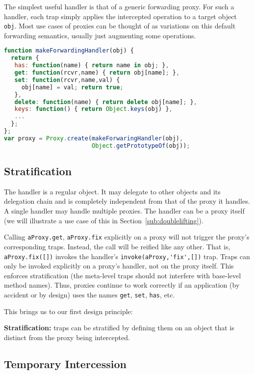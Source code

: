 \documentclass{acm_proc_article-sp}
\begin{document}
The simplest useful handler is that of a generic forwarding proxy. For such a handler, each trap simply applies the intercepted operation to a target object \texttt{obj}. Most use cases of proxies can be thought of as variations on this default forwarding semantics, usually just augmenting some operations.

\begin{lstlisting}[language=javascript]
function makeForwardingHandler(obj) {
  return {
   has: function(name) { return name in obj; },
   get: function(rcvr,name) { return obj[name]; },
   set: function(rcvr,name,val) {
     obj[name] = val; return true;
   },
   delete: function(name) { return delete obj[name]; },
   keys: function() { return Object.keys(obj) },
   ...
  };
};
var proxy = Proxy.create(makeForwaringHandler(obj),
                         Object.getPrototypeOf(obj));
\end{lstlisting}

\subsection{Stratification}

The handler is a regular object. It may delegate to other objects and its delegation chain and is completely independent from that of the proxy it handles. A single handler may handle multiple proxies. The handler can be a proxy itself (we will illustrate a use case of this in Section~\ref{sub:doublelifting}).

Calling \lstinline{aProxy.get}, \lstinline{aProxy.fix} explicitly on a proxy will not trigger the proxy's corresponding traps. Instead, the call will be reified like any other. That is, \lstinline{aProxy.fix([])} invokes the handler's \lstinline{invoke(aProxy,'fix',[])} trap. Traps can only be invoked explicitly on a proxy's handler, not on the proxy itself. This enforces stratification (the meta-level traps should not interfere with base-level method names). Thus, proxies continue to work correctly if an application (by accident or by design) uses the names \texttt{get}, \texttt{set}, \texttt{has}, etc.

This brings us to our first design principle:

\textbf{Stratification:} traps can be stratified by defining them on an object that is distinct from the proxy being intercepted.

\subsection{Temporary Intercession}
\label{sub:immutability}
\end{document}
